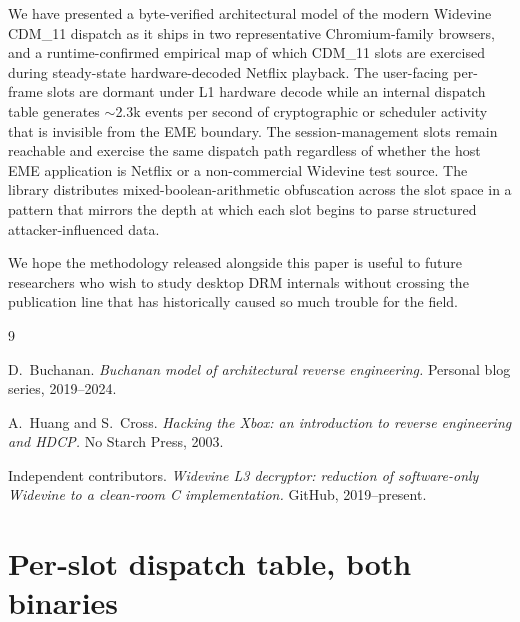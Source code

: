 \documentclass[11pt,letterpaper]{article}
\begin{document}
We have presented a byte-verified architectural model of the modern
Widevine CDM\_11 dispatch as it ships in two representative
Chromium-family browsers, and a runtime-confirmed empirical map of
which CDM\_11 slots are exercised during steady-state
hardware-decoded Netflix playback.  The user-facing per-frame
slots are dormant under L1 hardware decode while an internal
dispatch table generates $\sim$2.3k events per second of cryptographic
or scheduler activity that is invisible from the EME boundary.  The
session-management slots remain reachable and exercise the same
dispatch path regardless of whether the host EME application is
Netflix or a non-commercial Widevine test source.  The library
distributes mixed-boolean-arithmetic obfuscation across the slot
space in a pattern that mirrors the depth at which each slot begins
to parse structured attacker-influenced data.

We hope the methodology released alongside this paper is useful to
future researchers who wish to study desktop DRM internals without
crossing the publication line that has historically caused so much
trouble for the field.


\begin{thebibliography}{9}

D.~Buchanan.
\textit{Buchanan model of architectural reverse engineering.}
Personal blog series, 2019--2024.

A.~Huang and S.~Cross.
\textit{Hacking the Xbox: an introduction to reverse engineering and HDCP.}
No Starch Press, 2003.

Independent contributors.
\textit{Widevine L3 decryptor:  reduction of software-only Widevine to a clean-room C implementation.}
GitHub, 2019--present.

\end{thebibliography}

\appendix

\section{Per-slot dispatch table, both binaries}
\label{app:slot-table}
\end{document}
